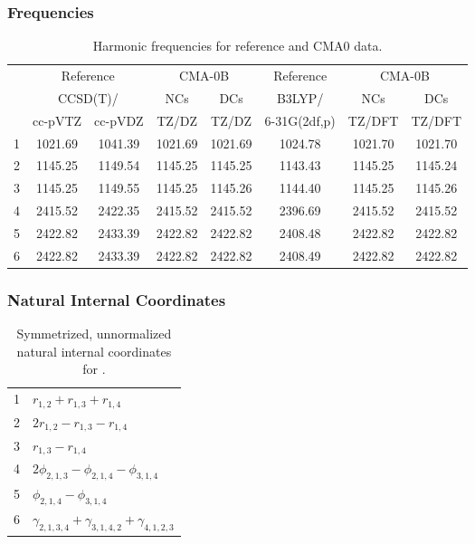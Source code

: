 \documentclass[10pt,oneside]{article}
\begin{document}
\subsubsection*{Frequencies}
\begin{table}[h!]
\centering
\caption{Harmonic frequencies for reference and CMA0 data.}
\begin{tabular}{cccccccc}
\toprule
{} & \multicolumn{2}{c}{Reference} & \multicolumn{2}{c}{CMA-0B} &    Reference & \multicolumn{2}{c}{CMA-0B} \\
{} & \multicolumn{2}{c}{CCSD(T)/} &     NCs &     DCs &       B3LYP/ &     NCs &     DCs \\
{} &   cc-pVTZ & cc-pVDZ &   TZ/DZ &   TZ/DZ & 6-31G(2df,p) &  TZ/DFT &  TZ/DFT \\
\midrule
1 &   1021.69 & 1041.39 & 1021.69 & 1021.69 &      1024.78 & 1021.70 & 1021.70 \\
2 &   1145.25 & 1149.54 & 1145.25 & 1145.25 &      1143.43 & 1145.25 & 1145.24 \\
3 &   1145.25 & 1149.55 & 1145.25 & 1145.26 &      1144.40 & 1145.25 & 1145.26 \\
4 &   2415.52 & 2422.35 & 2415.52 & 2415.52 &      2396.69 & 2415.52 & 2415.52 \\
5 &   2422.82 & 2433.39 & 2422.82 & 2422.82 &      2408.48 & 2422.82 & 2422.82 \\
6 &   2422.82 & 2433.39 & 2422.82 & 2422.82 &      2408.49 & 2422.82 & 2422.82 \\
\bottomrule
\end{tabular}
\end{table}

\clearpage

\subsubsection*{Natural Internal Coordinates}
\begin{table}[h!]
\centering
\caption{Symmetrized, unnormalized natural internal coordinates for .}
\small
\begin{tabular}{ll}
  1   & $r_{1,2} + r_{1,3} + r_{1,4}$ \\
  2   & $2r_{1,2} - r_{1,3} - r_{1,4}$ \\
  3   & $r_{1,3} - r_{1,4}$ \\
  4   & $2\phi_{2,1,3} - \phi_{2,1,4} - \phi_{3,1,4}$ \\
  5   & $\phi_{2,1,4} - \phi_{3,1,4}$ \\
  6   & $\gamma_{2,1,3,4} + \gamma_{3,1,4,2} + \gamma_{4,1,2,3}$ \\
\end{tabular}
\end{table}
\end{document}
